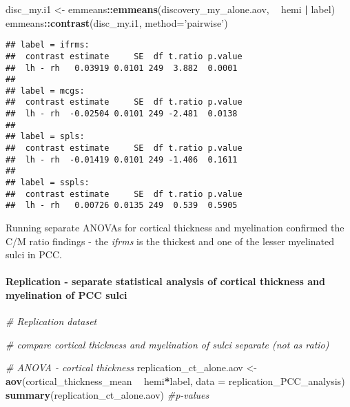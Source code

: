 \documentclass[
]{article}
\newenvironment{Shaded}{\begin{snugshade}}{\end{snugshade}}
\newcommand{\CommentTok}[1]{\textcolor[rgb]{0.56,0.35,0.01}{\textit{#1}}}
\newcommand{\DataTypeTok}[1]{\textcolor[rgb]{0.13,0.29,0.53}{#1}}
\newcommand{\KeywordTok}[1]{\textcolor[rgb]{0.13,0.29,0.53}{\textbf{#1}}}
\newcommand{\NormalTok}[1]{#1}
\newcommand{\OperatorTok}[1]{\textcolor[rgb]{0.81,0.36,0.00}{\textbf{#1}}}
\newcommand{\StringTok}[1]{\textcolor[rgb]{0.31,0.60,0.02}{#1}}
\begin{document}
\begin{Shaded}
\begin{Highlighting}[]
\NormalTok{disc_my.i1 <-}\StringTok{ }\NormalTok{emmeans}\OperatorTok{::}\KeywordTok{emmeans}\NormalTok{(discovery_my_alone.aov, }\OperatorTok{~}\StringTok{ }\NormalTok{hemi }\OperatorTok{|}\StringTok{ }\NormalTok{label)}
\NormalTok{emmeans}\OperatorTok{::}\KeywordTok{contrast}\NormalTok{(disc_my.i1, }\DataTypeTok{method=}\StringTok{'pairwise'}\NormalTok{)}
\end{Highlighting}
\end{Shaded}

\begin{verbatim}
## label = ifrms:
##  contrast estimate     SE  df t.ratio p.value
##  lh - rh   0.03919 0.0101 249  3.882  0.0001 
## 
## label = mcgs:
##  contrast estimate     SE  df t.ratio p.value
##  lh - rh  -0.02504 0.0101 249 -2.481  0.0138 
## 
## label = spls:
##  contrast estimate     SE  df t.ratio p.value
##  lh - rh  -0.01419 0.0101 249 -1.406  0.1611 
## 
## label = sspls:
##  contrast estimate     SE  df t.ratio p.value
##  lh - rh   0.00726 0.0135 249  0.539  0.5905
\end{verbatim}

Running separate ANOVAs for cortical thickness and myelination confirmed
the C/M ratio findings - the \emph{ifrms} is the thickest and one of the
lesser myelinated sulci in PCC.

\hypertarget{replication---separate-statistical-analysis-of-cortical-thickness-and-myelination-of-pcc-sulci}{%
\paragraph{Replication - separate statistical analysis of cortical
thickness and myelination of PCC
sulci}\label{replication---separate-statistical-analysis-of-cortical-thickness-and-myelination-of-pcc-sulci}}

\begin{Shaded}
\begin{Highlighting}[]
\CommentTok{# Replication dataset}

\CommentTok{# compare cortical thickness and myelination of sulci separate (not as ratio)}

\CommentTok{# ANOVA - cortical thickness}
\NormalTok{replication_ct_alone.aov <-}\StringTok{ }\KeywordTok{aov}\NormalTok{(cortical_thickness_mean }\OperatorTok{~}\StringTok{ }\NormalTok{hemi}\OperatorTok{*}\NormalTok{label, }\DataTypeTok{data =}\NormalTok{ replication_PCC_analysis)}
\KeywordTok{summary}\NormalTok{(replication_ct_alone.aov) }\CommentTok{#p-values}
\end{Highlighting}
\end{Shaded}
\end{document}
